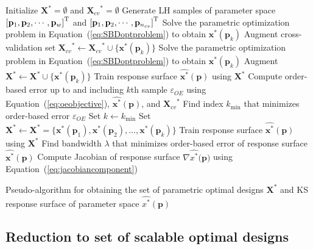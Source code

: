 \begin{algorithm}
	\DontPrintSemicolon %
	{\color{red} Initialize $\mathbf{X}^* = \emptyset$ and ${\mathbf{X}_{cv}}^* = \emptyset$}\;
	Generate \ac{LH} samples of parameter space $\left[\mathbf{p}_{1},\mathbf{p}_{2}, \cdots, \mathbf{p}_{w}\right]^{\text T}$ and $\left[\mathbf{p}_{1},\mathbf{p}_{2}, \cdots, \mathbf{p}_{n_{cv}}\right]^{\text T}$\;
	 {
		{\color{red} Solve the parametric optimization problem in Equation~(\ref{eq:SBDoptproblem}) to obtain $\mathbf{x}^*(\mathbf{p}_k)$}\;
		{\color{red} Augment cross-validation set ${\mathbf{X}_{cv}}^* \gets {\mathbf{X}_{cv}}^* \cup \{ \mathbf{x}^*(\mathbf{p}_k) \} $}\;
	}
	 {
		Solve the parametric optimization problem in Equation~(\ref{eq:SBDoptproblem}) to obtain $\mathbf{x}^*(\mathbf{p}_k)$\;
		Augment $\mathbf{X}^* \gets \mathbf{X}^* \cup \{ \mathbf{x}^*(\mathbf{p}_k) \} $\;
		Train response surface $\hat{\mathbf{x}^*}(\mathbf{p})$ using $\mathbf{X}^*$\;
		Compute order-based error up to and including $k$th sample $\varepsilon_{OE}$ using Equation~(\ref{eq:oeobjective}), $\hat{\mathbf{x}^*}(\mathbf{p})$, and ${\mathbf{X}_{cv}}^*$\;
	}
	Find index $k_{\textrm{min}}$ that minimizes order-based error $\varepsilon_{OE}$\;
	Set $k \gets k_{\textrm{min}} $ \;
	Set $\mathbf{X}^* \gets \mathbf{X}^*= \{ \mathbf{x}^*(\mathbf{p}_1),\mathbf{x}^*(\mathbf{p}_2),\ldots,\mathbf{x}^*(\mathbf{p}_k) \} $ \;
	Train response surface $\hat{\mathbf{x}^*}(\mathbf{p})$ using $\mathbf{X}^*$ \;
	Find bandwidth $\lambda$ that minimizes order-based error of response surface $\hat{\mathbf{x}^*}(\mathbf{p})$\;
	Compute Jacobian of response surface $\nabla\hat{{x}^*}(\mathbf{p)}$ using Equation~(\ref{eq:jacobiancomponent})\;
	\caption{Pseudo-algorithm for obtaining the set of parametric optimal designs $\mathbf{X}^*$ and \ac{KS} response surface of parameter space $\hat{{x}^*}(\mathbf{p})$}
	\label{algo:PODalgo}
\end{algorithm}

\subsection{Reduction to set of scalable optimal designs} \label{subsec:SBDfAM}

